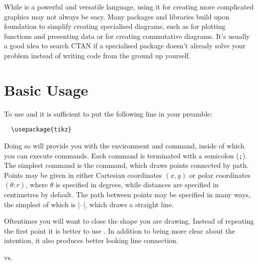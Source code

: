 While \TikZ{} is a powerful and versatile language, using it for creating more
complicated graphics may not always be easy. Many packages and libraries build
upon  foundation to simplify creating specialised diagrams, such as
 for plotting functions and presenting data or
 for creating commutative diagrams. It's usually a
good idea to search CTAN if a specialised package doesn't already solve your
problem instead of writing \TikZ{} code from the ground up yourself.

\section{Basic Usage}

To use  and \TikZ{} it is sufficient to put the following line in your
preamble:
\begin{verbatim}
  \usepackage{tikz}
\end{verbatim}
Doing so will provide you with the  environment and 
command, inside of which you can execute \TikZ{} commands. Each \TikZ{} command
is terminated with a semicolon (\verb|;|). The simplest command is the
 command, which draws points connected by path. Points may be given
in either Cartesian coordinates \((x, y)\) or polar coordinates
\((\theta\mathpunct{:} r)\), where \(\theta\) is specified in degrees, while
distances are specified in centimetres by default. The path
between points may be specified in many ways, the simplest of which is
\ltx|--|, which draws a straight line.
\begin{example}
\end{example}
Oftentimes you will want to close the shape you are drawing. Instead of
repeating the first point it is better to use . In addition to
being more clear about the intention, it also produces better looking
line connection.
\begin{example}[vertical_mode, examplewidth=0.75\linewidth]
vs.\ 
\end{example}


